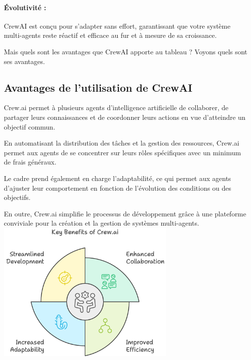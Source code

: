 \paragraph{\textbf{Évolutivité :}} CrewAI est conçu pour s'adapter sans effort, garantissant que votre système multi-agents reste réactif et efficace au fur et à mesure de sa croissance.

\medskip

\noindent
Mais quels sont les avantages que CrewAI apporte au tableau ? Voyons quels sont ses avantages.

\subsection*{Avantages de l'utilisation de CrewAI}

\noindent
Crew.ai permet à plusieurs agents d'intelligence artificielle de collaborer, de partager leurs connaissances et de coordonner leurs actions en vue d'atteindre un objectif commun.

\medskip

\noindent
En automatisant la distribution des tâches et la gestion des ressources, Crew.ai permet aux agents de se concentrer sur leurs rôles spécifiques avec un minimum de frais généraux.

\medskip

\noindent
Le cadre prend également en charge l'adaptabilité, ce qui permet aux agents d'ajuster leur comportement en fonction de l'évolution des conditions ou des objectifs.

\medskip

\noindent
En outre, Crew.ai simplifie le processus de développement grâce à une plateforme conviviale pour la création et la gestion de systèmes multi-agents.
\includegraphics[width=\linewidth, height=7cm]{images/key benefits of.png}

